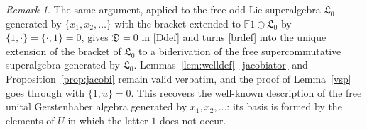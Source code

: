 \documentclass[11pt,reqno]{amsart}
\newcommand{\F}{\mathbb F}
\newcommand{\LL}{\mathfrak L}
\newcommand{\D}{\mathfrak D}
\theoremstyle{plain}
\theoremstyle{definition}
\theoremstyle{remark}
\newtheorem{remark}[theorem]{Remark}
\begin{document}
\begin{remark}
The same argument, applied to the free odd Lie superalgebra $\LL_0$ generated by $\{x_1,x_2,\dots\}$ with the bracket extended to $\F1\oplus\LL_0$ by $\{1,\cdot\}=\{\cdot,1\}=0$, gives $\D=0$ in \eqref{Ddef} and turns \eqref{brdef} into the unique extension of the bracket of $\LL_0$ to a biderivation of the free supercommutative superalgebra generated by $\LL_0$.
Lemmas~\ref{lem:welldef}--\ref{jacobiator} and Proposition~\ref{prop:jacobi} remain valid verbatim, and the proof of Lemma~\ref{vsp} goes through with $\{1,u\}=0$.
This recovers the well-known description of the free unital Gerstenhaber algebra generated by $x_1,x_2,\dots$: its basis is formed by the elements of $U$ in which the letter $1$ does not occur.
\end{remark}
\end{document}
